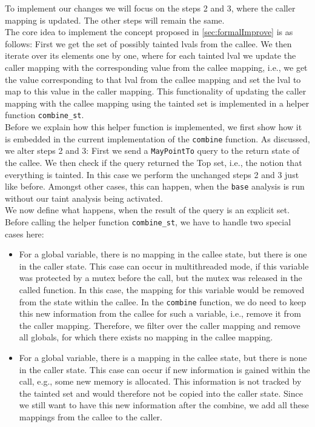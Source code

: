       To implement our changes we will focus on the steps 2 and 3, where the caller mapping is updated. The other steps will remain the same.\\
      The core idea to implement the concept proposed in \autoref{sec:formalImprove} is as follows: First we get the set of possibly tainted \ac{lval}s from the callee. We then iterate over its elements one by one, where for each tainted \ac{lval} we update the caller mapping with the corresponding value from the callee mapping, i.e., we get the value corresponding to that \ac{lval} from the callee mapping and set the \ac{lval} to map to this value in the caller mapping. This functionality of updating the caller mapping with the callee mapping using the tainted set is implemented in a helper function \texttt{combine\_st}.\\
      Before we explain how this helper function is implemented, we first show how it is embedded in the current implementation of the \texttt{combine} function. As discussed, we alter steps 2 and 3: First we send a \texttt{MayPointTo} query to the return state of the callee. We then check if the query returned the Top set, i.e., the notion that everything is tainted. In this case we perform the unchanged steps 2 and 3 just like before. Amongst other cases, this can happen, when the \texttt{base} analysis is run without our taint analysis being activated.\\
      We now define what happens, when the result of the query is an explicit set. Before calling the helper function \texttt{combine\_st}, we have to handle two special cases here:
      \begin{itemize}
        \item For a global variable, there is no mapping in the callee state, but there is one in the caller state. This case can occur in multithreaded mode, if this variable was protected by a mutex before the call, but the mutex was released in the called function. In this case, the mapping for this variable would be removed from the state within the callee. In the \texttt{combine} function, we do need to keep this new information from the callee for such a variable, i.e., remove it from the caller mapping. Therefore, we filter over the caller mapping and remove all globals, for which there exists no mapping in the callee mapping.

        \item For a global variable, there is a mapping in the callee state, but there is none in the caller state. This case can occur if new information is gained within the call, e.g., some new memory is allocated. This information is not tracked by the tainted set and would therefore not be copied into the caller state. Since we still want to have this new information after the combine, we add all these mappings from the callee to the caller.
      \end{itemize}
